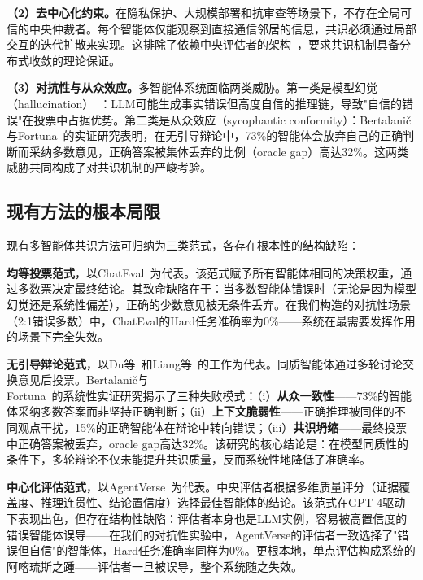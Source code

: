 \documentclass[12pt,a4paper,UTF8,fontset=fandol]{ctexart}
\begin{document}
\textbf{（2）去中心化约束。}在隐私保护、大规模部署和抗审查等场景下，不存在全局可信的中央仲裁者。每个智能体仅能观察到直接通信邻居的信息，共识必须通过局部交互的迭代扩散来实现。这排除了依赖中央评估者的架构~\cite{chen2023agentverse}，要求共识机制具备分布式收敛的理论保证。

\textbf{（3）对抗性与从众效应。}多智能体系统面临两类威胁。第一类是模型幻觉（hallucination）~\cite{ji2023hallucination}：LLM可能生成事实错误但高度自信的推理链，导致"自信的错误"在投票中占据优势。第二类是从众效应（sycophantic conformity）：Bertalani\v{c}与Fortuna~\cite{bertalanic2026cost}的实证研究表明，在无引导辩论中，73\%的智能体会放弃自己的正确判断而采纳多数意见，正确答案被集体丢弃的比例（oracle gap）高达32\%。这两类威胁共同构成了对共识机制的严峻考验。

\subsection{现有方法的根本局限}\label{sec:limitation}

现有多智能体共识方法可归纳为三类范式，各存在根本性的结构缺陷：

\textbf{均等投票范式}，以ChatEval~\cite{chan2023chateval}为代表。该范式赋予所有智能体相同的决策权重，通过多数票决定最终结论。其致命缺陷在于：当多数智能体错误时（无论是因为模型幻觉还是系统性偏差），正确的少数意见被无条件丢弃。在我们构造的对抗性场景（2:1错误多数）中，ChatEval的Hard任务准确率为0\%——系统在最需要发挥作用的场景下完全失效。

\textbf{无引导辩论范式}，以Du等~\cite{du2023improving}和Liang等~\cite{liang2023encouraging}的工作为代表。同质智能体通过多轮讨论交换意见后投票。Bertalani\v{c}与Fortuna~\cite{bertalanic2026cost}的系统性实证研究揭示了三种失败模式：（i）\textbf{从众一致性}——73\%的智能体采纳多数答案而非坚持正确判断；（ii）\textbf{上下文脆弱性}——正确推理被同伴的不同观点干扰，15\%的正确智能体在辩论中转向错误；（iii）\textbf{共识坍缩}——最终投票中正确答案被丢弃，oracle gap高达32\%。该研究的核心结论是：在模型同质性的条件下，多轮辩论不仅未能提升共识质量，反而系统性地降低了准确率。

\textbf{中心化评估范式}，以AgentVerse~\cite{chen2023agentverse}为代表。中央评估者根据多维质量评分（证据覆盖度、推理连贯性、结论置信度）选择最佳智能体的结论。该范式在GPT-4驱动下表现出色，但存在结构性缺陷：评估者本身也是LLM实例，容易被高置信度的错误智能体误导——在我们的对抗性实验中，AgentVerse的评估者一致选择了"错误但自信"的智能体，Hard任务准确率同样为0\%。更根本地，单点评估构成系统的阿喀琉斯之踵——评估者一旦被误导，整个系统随之失效。
\end{document}
